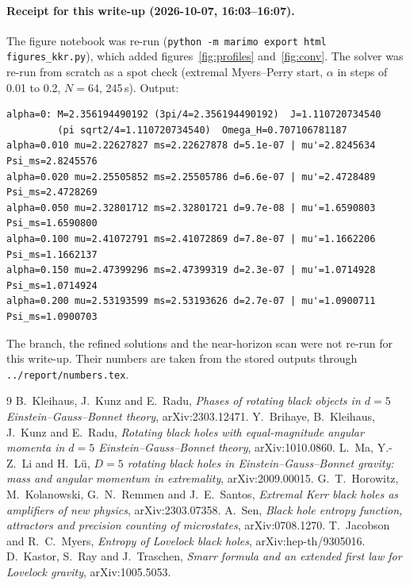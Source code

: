 \documentclass[11pt,a4paper]{article}
\begin{document}
\paragraph{Receipt for this write-up (2026-10-07, 16:03--16:07).} The figure
notebook was re-run (\texttt{python -m marimo export html figures\_kkr.py}), which
added figures~\ref{fig:profiles} and~\ref{fig:conv}. The solver was re-run from
scratch as a spot check (extremal Myers--Perry start, $\alpha$ in steps of 0.01
to 0.2, $N=64$, 245\,s). Output:
{\footnotesize
\begin{verbatim}
alpha=0: M=2.356194490192 (3pi/4=2.356194490192)  J=1.110720734540
         (pi sqrt2/4=1.110720734540)  Omega_H=0.707106781187
alpha=0.010 mu=2.22627827 ms=2.22627878 d=5.1e-07 | mu'=2.8245634 Psi_ms=2.8245576
alpha=0.020 mu=2.25505852 ms=2.25505786 d=6.6e-07 | mu'=2.4728489 Psi_ms=2.4728269
alpha=0.050 mu=2.32801712 ms=2.32801721 d=9.7e-08 | mu'=1.6590803 Psi_ms=1.6590800
alpha=0.100 mu=2.41072791 ms=2.41072869 d=7.8e-07 | mu'=1.1662206 Psi_ms=1.1662137
alpha=0.150 mu=2.47399296 ms=2.47399319 d=2.3e-07 | mu'=1.0714928 Psi_ms=1.0714924
alpha=0.200 mu=2.53193599 ms=2.53193626 d=2.7e-07 | mu'=1.0900711 Psi_ms=1.0900703
\end{verbatim}}
The branch, the refined solutions and the near-horizon scan were not re-run for
this write-up. Their numbers are taken from the stored outputs through
\texttt{../report/numbers.tex}.

\begin{thebibliography}{9}
 B.~Kleihaus, J.~Kunz and E.~Radu, \emph{Phases of rotating black
objects in $d=5$ Einstein--Gauss--Bonnet theory}, arXiv:2303.12471.
 Y.~Brihaye, B.~Kleihaus, J.~Kunz and E.~Radu, \emph{Rotating
black holes with equal-magnitude angular momenta in $d=5$ Einstein--Gauss--Bonnet
theory}, arXiv:1010.0860.
 L.~Ma, Y.-Z.~Li and H.~L\"u, \emph{$D=5$ rotating black
holes in Einstein--Gauss--Bonnet gravity: mass and angular momentum in
extremality}, arXiv:2009.00015.
 G.~T.~Horowitz, M.~Kolanowski, G.~N.~Remmen and J.~E.~Santos,
\emph{Extremal Kerr black holes as amplifiers of new physics}, arXiv:2303.07358.
 A.~Sen, \emph{Black hole entropy function, attractors and
precision counting of microstates}, arXiv:0708.1270.
 T.~Jacobson and R.~C.~Myers, \emph{Entropy of
Lovelock black holes}, arXiv:hep-th/9305016.
 D.~Kastor, S.~Ray and J.~Traschen, \emph{Smarr
formula and an extended first law for Lovelock gravity}, arXiv:1005.5053.
\end{thebibliography}
\end{document}
